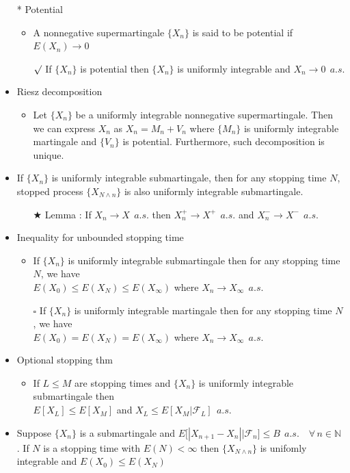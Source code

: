 \documentclass[12pt, A4]{article}
\newcommand{\sq}{$\square$}
\newcommand{\rmk}{$\surd$}
\newcommand{\trick}{$\bigstar$}
\newcommand{\N}{\mathbb{N}}
\newcommand{\F}{\mathcal{F}}
\newcommand{\foranyn}{\quad \forall \, n\in \N}
\begin{document}
\begin{itemize}
	\item[*] Potential
	\begin{itemize}
		\item A nonnegative supermartingale $\{X_n\}$ is said to be potential if $E(X_n)\rightarrow 0$
		\item[\rmk] If $\{X_n\}$ is potential then $\{X_n\}$ is uniformly integrable and $X_n\rightarrow 0\;\,a.s.$
	\end{itemize} 
	\item Riesz decomposition
	\begin{itemize}
		\item Let $\{X_n\}$ be a uniformly integrable nonnegative supermartingale. Then we can express $X_n$ as $X_n=M_n+V_n$ where $\{M_n\}$ is uniformly integrable martingale and $\{V_n\}$ is potential. Furthermore, such decomposition is unique. 
	\end{itemize}
	\item If $\{X_n\}$ is uniformly integrable submartingale, then for any stopping time $N$, stopped process $\{X_{N\wedge n}\}$ is also uniformly integrable submartingale.
	\begin{itemize}
		\item[\trick] Lemma : If $X_n\rightarrow X\;\, a.s.$ then $X_n^+\rightarrow X^+\;\,a.s.$ and $X_n^-\rightarrow X^-\;\,a.s.$
	\end{itemize}
	\item Inequality for unbounded stopping time
	\begin{itemize}
		\item If $\{X_n\}$ is uniformly integrable submartingale then for any stopping time $N$, we have \\$E(X_0)\leq E(X_N)\leq E(X_\infty)$ where $X_n\rightarrow X_\infty\;\,a.s.$
		\item[\sq] If $\{X_n\}$ is uniformly integrable martingale then for any stopping time $N$, we have \\$E(X_0)= E(X_N)= E(X_\infty)$ where $X_n\rightarrow X_\infty\;\,a.s.$
	\end{itemize}
	\item Optional stopping thm
	\begin{itemize}
		\item If $L\leq M$ are stopping times and $\{X_n\}$ is uniformly integrable submartingale then \\ $E[X_L]\leq E[X_M]$ and $X_L\leq E[X_M|\F_L]\;\,a.s.$
	\end{itemize}
	\item Suppose $\{X_n\}$ is a submartingale and $E\big[|X_{n+1}-X_n| \big|\F_n \big]\leq B\;\,a.s.\foranyn$ .  If $N$ is a stopping time with $E(N)<\infty$ then $\{X_{N\wedge n}\}$ is unifomly integrable and $E(X_0)\leq E(X_N)$

\end{itemize}
\end{document}
